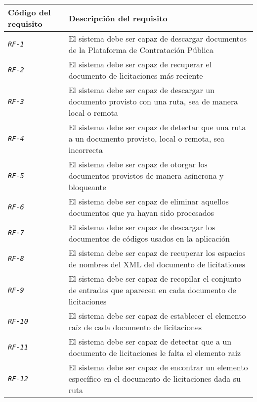             \begin{longtable}{|| M{3cm} | M{12cm} ||} 
                \hline
                    Código del requisito & Descripción del requisito \\
                \hline\hline
                    \texttt{\textit{RF-1}} & El sistema debe ser capaz de descargar documentos de la Plataforma de Contratación Pública \\ 
                \hline
                    \texttt{\textit{RF-2}} & El sistema debe ser capaz de recuperar el documento de licitaciones más reciente \\
                \hline
                    \texttt{\textit{RF-3}} & El sistema debe ser capaz de descargar un documento provisto con una ruta, sea de manera local o remota \\
                \hline
                    \texttt{\textit{RF-4}} & El sistema debe ser capaz de detectar que una ruta a un documento provisto, local o remota, sea incorrecta \\
                \hline
                    \texttt{\textit{RF-5}} & El sistema debe ser capaz de otorgar los documentos provistos de manera asíncrona y bloqueante \\
                \hline
                    \texttt{\textit{RF-6}} & El sistema debe ser capaz de eliminar aquellos documentos que ya hayan sido procesados \\
                \hline
                    \texttt{\textit{RF-7}} & El sistema debe ser capaz de descargar los documentos de códigos usados en la aplicación \\
                \hline
                    \texttt{\textit{RF-8}} & El sistema debe ser capaz de recuperar los espacios de nombres del XML del documento de licitationes \\
                \hline
                    \texttt{\textit{RF-9}} & El sistema debe ser capaz de recopilar el conjunto de entradas que aparecen en cada documento de licitaciones \\
                \hline
                    \texttt{\textit{RF-10}} & El sistema debe ser capaz de establecer el elemento raíz de cada documento de licitaciones \\
                \hline
                    \texttt{\textit{RF-11}} & El sistema debe ser capaz de detectar que a un documento de licitaciones le falta el elemento raíz \\
                \hline
                    \texttt{\textit{RF-12}} & El sistema debe ser capaz de encontrar un elemento específico en el documento de licitaciones dada su ruta \\

\end{longtable}

